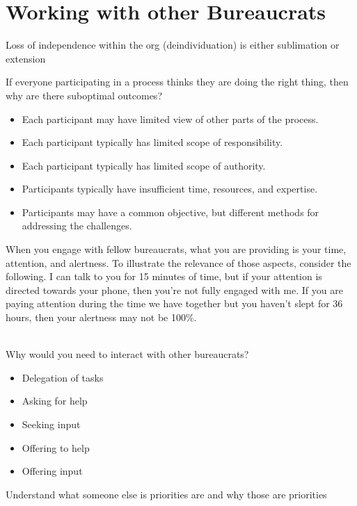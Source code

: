 \chapter{Working with other Bureaucrats\label{sec:working-with-other-bureaucrats}}

Loss of independence within the org (deindividuation) is either sublimation or extension 

If everyone participating in a process thinks they are doing the right thing, then why are there suboptimal outcomes?
\begin{itemize}
    \item Each participant may have limited view of other parts of the process.
    \item Each participant typically has limited scope of responsibility.
    \item Each participant typically has limited scope of authority.
    \item Participants typically have insufficient time, resources, and expertise.
    \item Participants may have a common objective, but different methods for addressing the challenges.
\end{itemize}


When you engage with fellow bureaucrats, what you are providing is your time, attention, and alertness. To illustrate the relevance of those aspects, consider the following. I can talk to you for 15 minutes of time, but if your attention is directed towards your phone, then you're not fully engaged with me. If you are paying attention during the time we have together but you haven't slept for 36 hours, then your alertness may not be 100\%. 

\ \\

Why would you need to interact with other bureaucrats?
\begin{itemize}
    \item Delegation of tasks
    \item Asking for help
    \item Seeking input
    \item Offering to help
    \item Offering input
\end{itemize}

Understand what someone else is priorities are and why those are priorities

